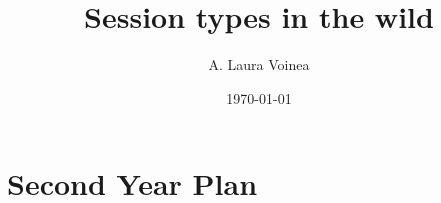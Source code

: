 \documentclass{mproj}
\begin{document}
\title{Session types in the wild}

\author{A. Laura Voinea}
\date{\today}

\maketitle

\tableofcontents
\clearpage

\renewcommand*\thesection{\arabic{section}}

%

%

\clearpage
\appendix
\section{Second Year Plan}
\label{appendix:gantt}
\end{document}
